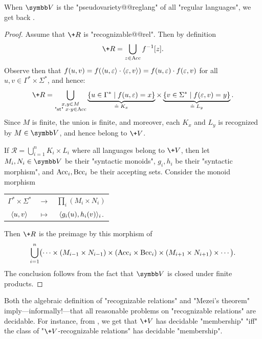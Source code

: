 When $\B{V}$ is the "pseudovariety@@reglang" of all "regular languages",
we get back .

\begin{proof}
	Assume that $\+R$ is "recognizable@@rel". 
	Then by definition
	\[
		\+R = \bigcup_{z \in \Acc} f^{-1}[z].
	\]
	Observe then that $f(u,v) = f(\langle u,\varepsilon\rangle\cdot\langle\varepsilon,v\rangle)
	= f(u,\varepsilon)\cdot f(\varepsilon,v)$ for all $u,v \in \Gamma^* \times \Sigma^*$, and hence:
	\[
		\+R = \bigcup_{\substack{x,y \in M\\ \text{"st" } x\cdot y \in \Acc}}
		\underbrace{\{u \in \Gamma^* \mid f(u, \varepsilon) = x\}}_{\defeq \;K_x}
		\times \underbrace{\{v \in \Sigma^* \mid f(\varepsilon, v) = y\}}_{\defeq \;L_y}.
	\]
	Since $M$ is finite, the union is finite, and moreover, each $K_x$ and $L_y$ is
	recognized by $M \in \B{V}$, and hence belong to $\+V$.

	 If $\mathcal{R} = \bigcup_{i=1}^n K_i \times L_i$ 
		where all languages belong to $\+V$, then let $M_i,N_i \in \B{V}$
		be their "syntactic monoids", $g_i,h_i$ be their
		"syntactic morphism", and $\textrm{Acc}_i,\textrm{Bcc}_i$ be their accepting sets.
		Consider the monoid morphism
		\begin{center}
		\begin{tabular}{ccc}
			$\Gamma^* \times \Sigma^*$ & $\to$ & $\prod_{i}(M_i \times N_i)$ \\
			$\langle u,v\rangle$ & $\mapsto$ & $\langle g_i(u), h_i(v)\rangle_{i}$.
		\end{tabular}
		\end{center}
		Then $\+R$ is the preimage by this morphism of
		\[
			\bigcup_{i=1}^n \bigl(
			\cdots \times (M_{i-1}\times N_{i-1}) \times
			(\textrm{Acc}_i \times \textrm{Bcc}_i) \times (M_{i+1}\times N_{i+1}) \times \cdots \bigr).
		\]
		The conclusion follows from the fact that $\B{V}$ is closed under finite products.
\end{proof}

Both the algebraic definition of "recognizable relations" and
"Mezei's theorem" imply---informally!---that all reasonable problems on
"recognizable relations" are decidable. For instance, from ,
we get that $\+V$ has decidable "membership" "iff" the class of "$\+V$-recognizable relations"
has decidable "membership".

